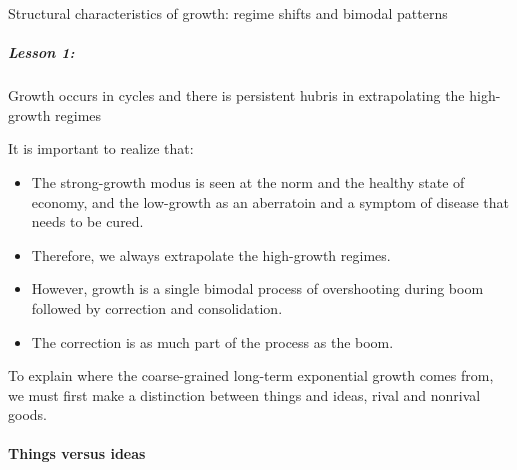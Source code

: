 Structural characteristics of growth: regime shifts and bimodal patterns

\subparagraph{Lesson 1:} Growth occurs in cycles and there is persistent
hubris in extrapolating the high-growth regimes

\vspace{1\baselineskip}

It is important to realize that:
\begin{itemize}
    \item The strong-growth modus is seen at the norm and the healthy state of
        economy, and the low-growth as an aberratoin and a symptom of disease
        that needs to be cured.
    \item Therefore, we always extrapolate the high-growth regimes.
    \item However, growth is a single bimodal process of overshooting during
        boom followed by correction and consolidation.
    \item The correction is as much part of the process as the boom.
\end{itemize}

To explain where the coarse-grained long-term exponential growth comes from,
we must first make a distinction between things and ideas, rival and nonrival
goods.

\paragraph{Things versus ideas}

